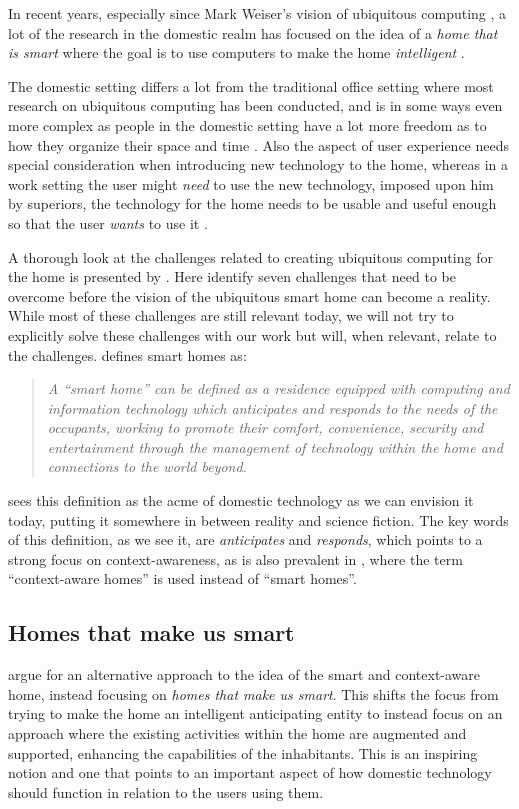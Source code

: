 In recent years, especially since Mark Weiser's vision of ubiquitous computing \citep{weiser1991computer}, a lot of the research in the domestic realm has focused on the idea of a \emph{home that is smart} where the goal is to use computers to make the home \emph{intelligent} \citep{taylor2007homes}.

The domestic setting differs a lot from the traditional office setting where most research on ubiquitous computing has been conducted, and is in some ways even more complex as people in the domestic setting have a lot more freedom as to how they organize their space and time \cite{meyer2003survey}.
Also the aspect of user experience needs special consideration when introducing new technology to the home, whereas in a work setting the user might \emph{need} to use the new technology, imposed upon him by superiors, the technology for the home needs to be usable and useful enough so that the user \emph{wants} to use it \citep{meyer2003survey}.

A thorough look at the challenges related to creating ubiquitous computing for the home is presented by \citet{edwards2001home}.
Here \citeauthor{edwards2001home} identify seven challenges that need to be overcome before the vision of the ubiquitous smart home can become a reality. 
While most of these challenges are still relevant today, we will not try to explicitly solve these challenges with our work but will, when relevant, relate to the challenges.
\blank
\citet{aldrich2003smart} defines smart homes as:

\begin{quotation}
\emph{A ``smart home'' can be defined as a residence equipped with computing and information technology which anticipates and responds to the needs of the occupants, working to promote their comfort, convenience, security and entertainment through the management of technology within the home and connections to the world beyond.}
\end{quotation}
\citeauthor{aldrich2003smart} sees this definition as the acme of domestic technology as we can envision it today, putting it somewhere in between reality and science fiction.
The key words of this definition, as we see it, are \emph{anticipates} and \emph{responds}, which points to a strong focus on context-awareness, as is also prevalent in \citep{meyer2003survey}, where the term ``context-aware homes'' is used instead of ``smart homes''. 

\subsection{Homes that make us smart}
\citet{taylor2007homes} argue for an alternative approach to the idea of the smart and context-aware home, instead focusing on \emph{homes that make us smart}. 
This shifts the focus from trying to make the home an intelligent anticipating entity to instead focus on an approach where the existing activities within the home are augmented and supported, enhancing the capabilities of the inhabitants.
This is an inspiring notion and one that points to an important aspect of how domestic technology should function in relation to the users using them.

